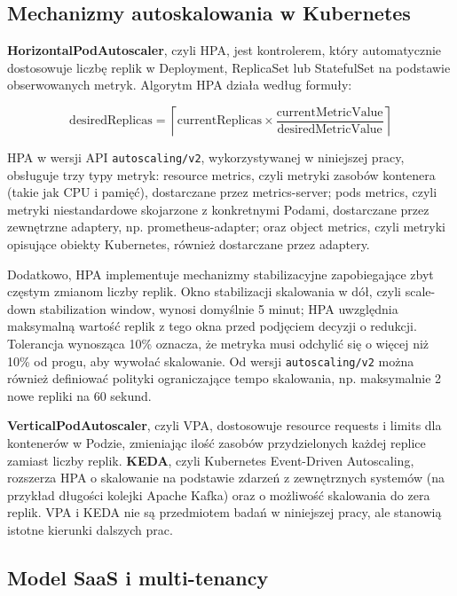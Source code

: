 \subsection{Mechanizmy autoskalowania w Kubernetes}

\textbf{HorizontalPodAutoscaler}, czyli HPA, jest kontrolerem, który automatycznie dostosowuje liczbę replik w Deployment, ReplicaSet lub StatefulSet na podstawie obserwowanych metryk. Algorytm HPA działa według formuły:

\begin{equation}
  \text{desiredReplicas} = \left\lceil \text{currentReplicas} \times \frac{\text{currentMetricValue}}{\text{desiredMetricValue}} \right\rceil
\end{equation}

HPA w wersji API \texttt{autoscaling/v2}, wykorzystywanej w niniejszej pracy, obsługuje trzy typy metryk: resource metrics, czyli metryki zasobów kontenera (takie jak CPU i pamięć), dostarczane przez metrics-server; pods metrics, czyli metryki niestandardowe skojarzone z konkretnymi Podami, dostarczane przez zewnętrzne adaptery, np. prometheus-adapter; oraz object metrics, czyli metryki opisujące obiekty Kubernetes, również dostarczane przez adaptery.

Dodatkowo, HPA implementuje mechanizmy stabilizacyjne zapobiegające zbyt częstym zmianom liczby replik. Okno stabilizacji skalowania w dół, czyli scale-down stabilization window, wynosi domyślnie 5 minut; HPA uwzględnia maksymalną wartość replik z tego okna przed podjęciem decyzji o redukcji. Tolerancja wynosząca 10\% oznacza, że metryka musi odchylić się o więcej niż 10\% od progu, aby wywołać skalowanie. Od wersji \texttt{autoscaling/v2} można również definiować polityki ograniczające tempo skalowania, np. maksymalnie 2 nowe repliki na 60 sekund.

\textbf{VerticalPodAutoscaler}, czyli VPA, dostosowuje resource requests i limits dla kontenerów w Podzie, zmieniając ilość zasobów przydzielonych każdej replice zamiast liczby replik. \textbf{KEDA}, czyli Kubernetes Event-Driven Autoscaling, rozszerza HPA o skalowanie na podstawie zdarzeń z zewnętrznych systemów (na przykład długości kolejki Apache Kafka) oraz o możliwość skalowania do zera replik. VPA i KEDA nie są przedmiotem badań w niniejszej pracy, ale stanowią istotne kierunki dalszych prac.

\subsection{Model SaaS i multi-tenancy}

